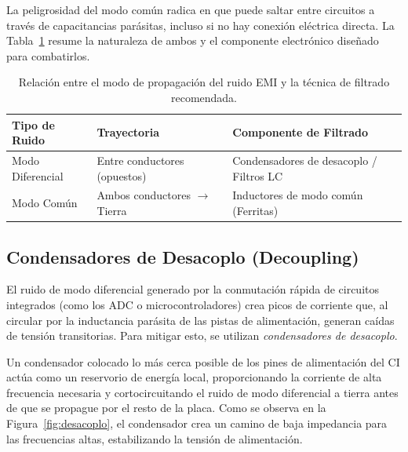La peligrosidad del modo común radica en que puede saltar entre circuitos a través de capacitancias parásitas, incluso si no hay conexión eléctrica directa. La Tabla~\ref{tab:modos_filtrado} resume la naturaleza de ambos y el componente electrónico diseñado para combatirlos.

\begin{table}[ht]
    \centering
    \small
    \setlength{\tabcolsep}{3pt}
    \renewcommand{\tabularxcolumn}[1]{m{#1}}
    \begin{tabularx}{\linewidth}{@{} >{\centering\arraybackslash}X >{\centering\arraybackslash}X >{\centering\arraybackslash}X @{}}
        \toprule
        \textbf{Tipo de Ruido} & \textbf{Trayectoria} & \textbf{Componente de Filtrado} \\
        \midrule
        Modo Diferencial & Entre conductores (opuestos) & Condensadores de desacoplo / Filtros LC \\
        Modo Común & Ambos conductores $\to$ Tierra & Inductores de modo común (Ferritas) \\
        \bottomrule
    \end{tabularx}
    \caption{Relación entre el modo de propagación del ruido EMI y la técnica de filtrado recomendada.\protect\label{tab:modos_filtrado}}
\end{table}

\subsection{Condensadores de Desacoplo (Decoupling)}\label{sub:desacoplo}

El ruido de modo diferencial generado por la conmutación rápida de circuitos integrados (como los ADC o microcontroladores) crea picos de corriente que, al circular por la inductancia parásita de las pistas de alimentación, generan caídas de tensión transitorias. Para mitigar esto, se utilizan \emph{condensadores de desacoplo}.

Un condensador colocado lo más cerca posible de los pines de alimentación del CI actúa como un reservorio de energía local, proporcionando la corriente de alta frecuencia necesaria y cortocircuitando el ruido de modo diferencial a tierra antes de que se propague por el resto de la placa. Como se observa en la Figura~\ref{fig:desacoplo}, el condensador crea un camino de baja impedancia para las frecuencias altas, estabilizando la tensión de alimentación.

